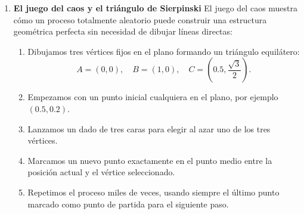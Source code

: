 \documentclass[12pt]{article}
\begin{document}
\begin{problemas}[]
\begin{enumerate}[leftmargin=*]
El conjunto de Julia reúne a todos los puntos iniciales $z_0$ que no se escapan a 
infinito bajo la iteración. 
Dependiendo del valor de $c$ que elijamos,
obtendremos figuras conectadas con patrones intrincados o figuras que se 
desmoronan en polvo.

\paragraph{Instrucciones:}
\begin{enumerate}
    \item Elija una constante compleja de prueba, 
    por ejemplo $c = -0.7 + 0.27015i$ o $c = -0.4 + 0.6i$.
    \item Construya una cuadrícula en el plano complejo para 
    $z_0 = x + iy$ en el intervalo $-1.5 \le x \le 1.5$ y $-1.2 \le y \le 1.2$.
    \item Itere la ecuación hasta 100 veces por cada punto. 
    Guarde en una matriz cuántas iteraciones tardó cada punto en superar la barrera $|z| > 2$.
    \item Muestre la imagen resultante con un mapa de color como 
    \texttt{"inferno"} o \texttt{"magma"}. Ensaye cambiando ligeramente el 
    valor de $c$ y observe cómo muta la figura.
\end{enumerate}

\item  \textbf{El juego del caos y el triángulo de Sierpinski} El juego del caos muestra cómo un proceso totalmente aleatorio puede construir una estructura geométrica perfecta sin necesidad de dibujar líneas directas:
\begin{enumerate}
    \item Dibujamos tres vértices fijos en el plano formando un triángulo equilátero:
    \begin{equation*}
        A = (0, 0), \quad B = (1, 0), \quad C = (0.5, \frac{\sqrt{3}}{2}).
    \end{equation*}
    \item Empezamos con un punto inicial cualquiera en el plano, por ejemplo $(0.5, 0.2)$.
    \item Lanzamos un dado de tres caras para elegir al azar uno de los tres vértices.
    \item Marcamos un nuevo punto exactamente en el punto medio entre la posición actual y el vértice seleccionado.
    \item Repetimos el proceso miles de veces, usando siempre el último punto marcado como punto de partida para el siguiente paso.
\end{enumerate}


\end{enumerate}
\end{problemas}
\end{document}
